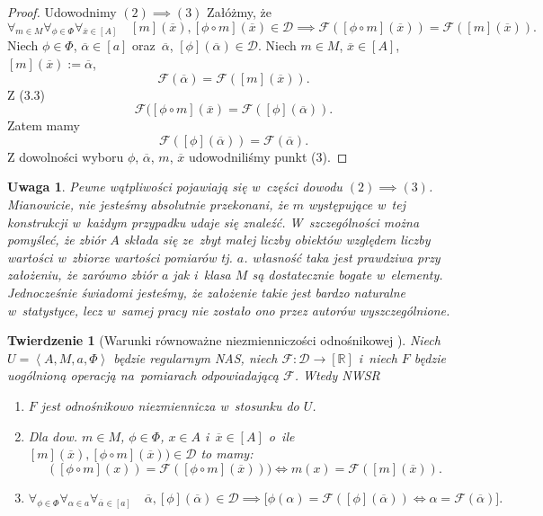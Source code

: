 \documentclass[12pt,a4paper]{report}
\newtheorem{tw}[definition]{Twierdzenie}
\newtheorem{remark}[definition]{Uwaga}
\newcommand{\domkniecie}[1]{\left[ {#1} \right] }
\newcommand{\tuple}[1]{\left\langle {#1} \right\rangle}
\begin{document}
\begin{proof}
Udowodnimy $(2) \implies (3)$
Załóżmy, że
\begin{equation}
\forall_{m \in M}\forall_{\phi \in \Phi} \forall_{\overline{x} \in \domkniecie{A}} \quad \domkniecie{m}(\overline{x}),\domkniecie{\phi\circ m}(\overline{x}) \in \mathcal{D} \implies \mathcal{F}( \domkniecie{\phi \circ m}(\overline{x}))=\mathcal{F}(\domkniecie{m}(\overline{x})).
\end{equation}
Niech $\phi \in \Phi$, $\overline{\alpha} \in \domkniecie{a}$ oraz~$\overline{\alpha}$, $\domkniecie{\phi}(\overline{\alpha})\in \mathcal{D}$. Niech $m \in M$, $\overline{x} \in \domkniecie{A}$, $\domkniecie{m}(\overline{x}):= \overline{\alpha}$, 
$$
 \mathcal{F}(\overline{\alpha})=\mathcal{F}(\domkniecie{m}(\overline{x})).
$$
Z (3.3)
$$
\mathcal{F}(\domkniecie{\phi \circ m}(\overline{x})=\mathcal{F}(\domkniecie{\phi}(\overline{\alpha})).
$$
Zatem mamy
$$
\mathcal{F}(\domkniecie{\phi}(\overline{\alpha}))=\mathcal{F}(\overline{\alpha}).
$$
Z dowolności wyboru $\phi$, $\overline{\alpha}$, $m$, $\overline{x}$ udowodniliśmy punkt (3).
\end{proof}
\begin{remark}
Pewne wątpliwości pojawiają się w~części dowodu $(2) \implies (3)$. Mianowicie, nie jesteśmy absolutnie przekonani, że $m$ występujące w~tej konstrukcji w~każdym przypadku udaje się znaleźć. W~szczególności można pomyśleć, że zbiór $A$ składa się ze~zbyt małej liczby obiektów względem liczby wartości w~zbiorze wartości pomiarów tj. $a$. własność taka jest prawdziwa przy założeniu, że zarówno zbiór $a$ jak i~klasa $M$ są dostatecznie bogate w~elementy. Jednocześnie świadomi jesteśmy, że założenie takie jest bardzo naturalne w~statystyce, lecz w~samej pracy nie zostało ono przez autorów wyszczególnione. 
\end{remark}
\begin{tw}[Warunki równoważne niezmienniczości odnośnikowej {\citep[Tw. 1]{adams1965theory}}]
Niech $U=\tuple{A,M,a,\Phi}$ będzie regularnym NAS, niech $\mathcal{F}:\mathcal{D}\to \domkniecie{\mathbb{R}}$ i~niech $F$ będzie uogólnioną operacją na~pomiarach odpowiadającą $\mathcal{F}$. Wtedy
NWSR
\begin{enumerate}
\item
$F$ jest odnośnikowo niezmiennicza w~stosunku do $U$.
\item
Dla dow. $m \in M$, $\phi \in \Phi$, $ x \in A$ i~$\overline{x} \in \domkniecie{A}$ o~ile $\domkniecie{m}(\overline{x}), \domkniecie{\phi\circ m}(\overline{x})) \in \mathcal{D}$ to mamy:
$$
(\domkniecie{\phi\circ m}(x))=\mathcal{F}( \domkniecie{\phi \circ m}(\overline{x}))) \iff m(x)=\mathcal{F}(\domkniecie{m}(\overline{x})).
$$
\item
$$
\forall_{\phi \in \Phi}\forall_{\alpha \in a}\forall_{\overline{\alpha} \in \domkniecie{a}} \quad \overline{\alpha}, \domkniecie{\phi}(\overline{\alpha}) \in \mathcal{D} \implies \big[\phi(\alpha)=\mathcal{F}(\domkniecie{\phi}(\overline{\alpha})) \iff \alpha=\mathcal{F}(\overline{\alpha})\big].
$$
\end{enumerate}

\end{tw}
\end{document}
